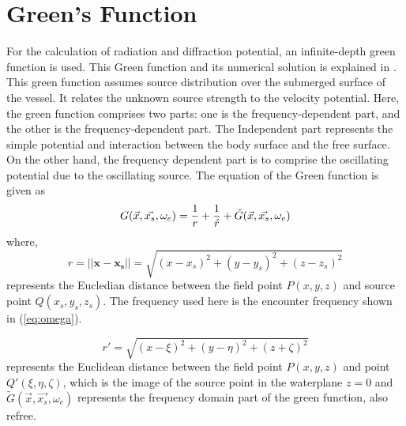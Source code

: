 \section{Green's Function}
\label{sec:green_fun}
For the calculation of radiation and diffraction potential, an infinite-depth green function is 
used. This Green function and its numerical solution is explained in \cite{telste1986numerical}. 
This green function assumes source distribution over the submerged surface of the vessel. 
It relates the unknown source strength to the velocity potential. Here, the green function 
comprises two parts: one is the frequency-dependent part, and the other is the 
frequency-dependent part.  The Independent part represents the simple potential 
and interaction between the body surface and the free surface. On the other hand, 
the frequency dependent part is to comprise the oscillating potential due to the 
oscillating source. The equation of the Green function is given as 
\begin{equation}
    \label{eq:green_eq}
    G(\vec{x}, \vec{x_s}, \omega_e) = \frac{1}{r} + \frac{1}{\acute{r}} + \Tilde{G}(\vec{x}, \vec{x_s}, \omega_e) 
\end{equation}
where, 
\begin{equation}
    r = ||\boldsymbol{x} - \boldsymbol{x_s}|| = \sqrt{(x-x_s)^2+(y-y_s)^2+(z-z_s)^2}
\end{equation}
represents the Eucledian distance between the field point $P(x, y, z)$ and source 
point $Q(x_s, y_s, z_s)$. The frequency used here is the encounter frequency shown in 
(\ref{eq:omega}).

\begin{equation}
    r' = \sqrt{(x - \xi)^2 + (y - \eta)^2 + (z + \zeta)^2}   
\end{equation}
represents the Euclidean distance between the field point $P(x, y, z)$ and point 
$Q'(\xi, \eta, \zeta)$, which is the image of the source point in the waterplane 
$z=0$ and $\tilde{G}(\vec{x}, \vec{x_s}, \omega_e)$ represents the frequency domain 
part of the green function, also refree.


